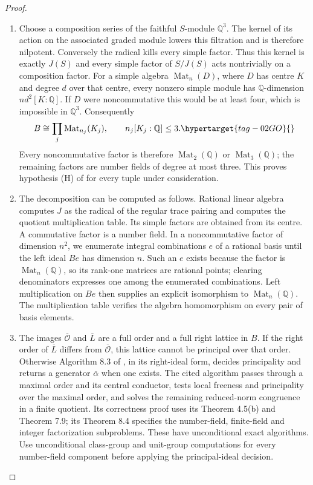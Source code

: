 \documentclass[11pt,a4paper]{article}
\numberwithin{equation}{section}
\theoremstyle{definition}
\begin{document}
\begin{proof}
\begin{enumerate}[label=\arabic*.]
\item Choose a composition series of the faithful $S$-module $\mathbb Q^3$.
The kernel of its action on the associated graded module lowers this
filtration and is therefore nilpotent. Conversely the radical kills
every simple factor. Thus this kernel is exactly $J(S)$ and every
simple factor of $S/J(S)$ acts nontrivially on a composition factor.
For a simple algebra $\operatorname{Mat}_n(D)$, where $D$ has centre
$K$ and degree $d$ over that centre, every nonzero simple module has
$\mathbb Q$-dimension $n d^2[K:\mathbb Q]$. If $D$ were
noncommutative this would be at least four, which is impossible in
$\mathbb Q^3$. Consequently
\begin{equation}
 B\cong\prod_j\operatorname{Mat}_{n_j}(K_j),\qquad
 n_j[K_j:\mathbb Q]\le3.                                    \hypertarget{tag-02GO}{}\label{maps:eq:F.IC3}
\end{equation}
Every noncommutative factor is therefore
$\operatorname{Mat}_2(\mathbb Q)$ or
$\operatorname{Mat}_3(\mathbb Q)$; the remaining factors are number
fields of degree at most three. This proves hypothesis (H) of \cite[hypothesis (H), p.~2; Algorithm~8.3, p.~21]{rootBHJ22} for every tuple under consideration.

\item The decomposition can be computed as follows. Rational linear algebra computes $J$ as the radical of the
regular trace pairing and computes the quotient multiplication table.
Its simple factors are obtained from its centre. A commutative factor
is a number field. In a noncommutative factor of dimension $n^2$, we
enumerate integral combinations $e$ of a rational basis until the
left ideal $Be$ has dimension $n$. Such an $e$ exists because the
factor is $\operatorname{Mat}_n(\mathbb Q)$, so its rank-one matrices
are rational points; clearing denominators expresses one among the
enumerated combinations. Left multiplication on $Be$ then supplies
an explicit isomorphism to $\operatorname{Mat}_n(\mathbb Q)$.
The multiplication table verifies the algebra homomorphism on every
pair of basis elements.

\item The images $\overline{\mathcal O}$ and $\overline L$ are a full order
and a full right lattice in $B$. If the right order of
$\overline L$ differs from $\overline{\mathcal O}$, this lattice
cannot be principal over that order. Otherwise Algorithm 8.3 of
\cite[Algorithm 8.3 and its correctness proof, p.~21]{rootBHJ22}, in its right-ideal form, decides principality and
returns a generator $\overline\alpha$ when one exists. The cited
algorithm passes through a maximal order and its central conductor,
tests local freeness and principality over the maximal order, and
solves the remaining reduced-norm congruence in a finite quotient.
Its correctness proof uses its Theorem 4.5(b) and Theorem 7.9; its
Theorem 8.4 specifies the number-field, finite-field and integer
factorization subproblems. These have unconditional exact algorithms.
Use unconditional class-group and unit-group computations for every
number-field component before applying the principal-ideal decision.


\end{enumerate}
\end{proof}
\end{document}
